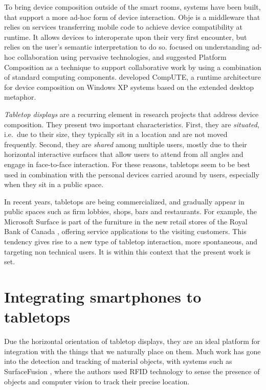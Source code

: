 To bring device composition outside of the smart rooms, systems have been built, that support a more ad-hoc form of device interaction.
Obje \citep{Edwards:2009:obje} is a middleware that relies on services transferring mobile code to achieve device compatibility at runtime.
It allows devices to interoperate upon their very first encounter, but relies on the user's semantic interpretation to do so.
\cite{Pering:2009:platformcomp} focused on understanding ad-hoc collaboration using pervasive technologies, and suggested Platform Composition as a technique to support collaborative work by using a combination of standard computing components.
\cite{Bardram:2010:compute} developed CompUTE, a runtime architecture for device composition on Windows XP systems based on the extended desktop metaphor.

\emph{Tabletop displays} are a recurring element in research projects that address device composition.
They present two important characteristics.
First, they are \emph{situated}, i.e.\ due to their size, they typically sit in a location and are not moved frequently.
Second, they are \emph{shared} among multiple users, mostly due to their horizontal interactive surfaces that allow users to attend from all angles and engage in face-to-face interaction.
For these reasons, tabletops seem to be best used in combination with the personal devices carried around by users, especially when they sit in a public space.

In recent years, tabletops are being commercialized, and gradually appear in public spaces such as firm lobbies, shops, bars and restaurants.
For example, the Microsoft Surface is part of the furniture in the new retail stores of the Royal Bank of Canada \citep{mscase}, offering service applications to the visiting customers.
This tendency gives rise to a new type of tabletop interaction, more spontaneous, and targeting non technical users.
It is within this context that the present work is set.

\section{Integrating smartphones to tabletops}
\label{sec:rwintegration}

Due the horizontal orientation of tabletop displays, they are an ideal platform for integration with the things that we naturally place on them.
Much work has gone into the detection and tracking of material objects, with systems such as SurfaceFusion \citep{Olwal:2008:surfacefusion}, where the authors used RFID technology to sense the presence of objects and computer vision to track their precise location.

